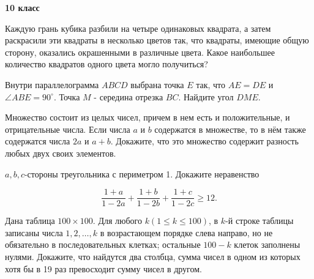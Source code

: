 \centerline{\bf \Huge 10 класс}

Каждую грань кубика разбили на четыре одинаковых квадрата, а затем раскрасили эти квадраты в несколько цветов так, что квадраты, имеющие общую сторону, оказались окрашенными в различные цвета. Какое наибольшее количество квадратов одного цвета могло получиться?

Внутри параллелограмма $A B C D$ выбрана точка $E$ так, что $A E=D E$ и $\angle A B E=90^{\circ}$. Точка $M$ - середина отрезка $B C$. Найдите угол $D M E$.

Множество состоит из целых чисел, причем в нем есть и положительные, и отрицательные числа. Если числа $a$ и $b$ содержатся в множестве, то в нём также содержатся числа $2 a$ и $a+b$. Докажите, что это множество содержит разность любых двух своих элементов.

$a, b, c$-стороны треугольника с периметром 1. Докажите неравенство

$$
\frac{1+a}{1-2 a}+\frac{1+b}{1-2 b}+\frac{1+c}{1-2 c} \geqslant 12 .
$$
 
Дана таблица $100 \times 100$. Для любого $k(1 \leqslant k \leqslant 100)$, в $k$-й строке таблицы записаны числа $1,2, \ldots, k$ в возрастающем порядке слева направо, но не обязательно в последовательных клетках; остальные $100-k$ клеток заполнены нулями. Докажите, что найдутся два столбца, сумма чисел в одном из которых хотя бы в 19 раз превосходит сумму чисел в другом.
